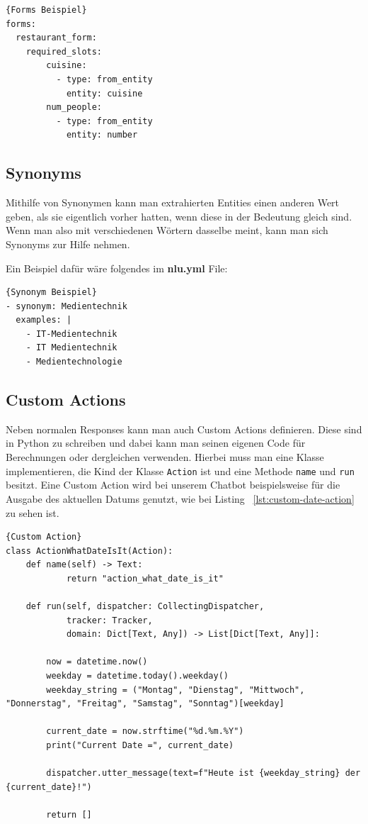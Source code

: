 \begin{lstlisting}[label={lst:forms-example},caption={Forms Beispiel}]{Forms Beispiel}
forms:
  restaurant_form:
    required_slots:
        cuisine:
          - type: from_entity
            entity: cuisine
        num_people:
          - type: from_entity
            entity: number
\end{lstlisting}

\subsection{Synonyms}

Mithilfe von Synonymen kann man extrahierten Entities einen anderen Wert geben, als sie eigentlich vorher hatten, wenn diese in der Bedeutung gleich sind.
Wenn man also mit verschiedenen Wörtern dasselbe meint, kann man sich Synonyms zur Hilfe nehmen.\cite{synonyms}

Ein Beispiel dafür wäre folgendes im \textbf{nlu.yml} File:

\begin{lstlisting}[label={lst:synonym-example},caption={Synonym Beispiel}]{Synonym Beispiel}
- synonym: Medientechnik
  examples: |
    - IT-Medientechnik
    - IT Medientechnik
    - Medientechnologie
\end{lstlisting}

\subsection{Custom Actions}

Neben normalen Responses kann man auch Custom Actions definieren.
Diese sind in Python zu schreiben und dabei kann man seinen eigenen Code für Berechnungen oder dergleichen verwenden.
Hierbei muss man eine Klasse implementieren, die Kind der Klasse \texttt{Action} ist und eine Methode \texttt{name} und \texttt{run} besitzt.
Eine Custom Action wird bei unserem Chatbot beispielsweise für die Ausgabe des aktuellen Datums genutzt, wie bei Listing ~\ref{lst:custom-date-action} zu sehen ist.

\begin{lstlisting}[label={lst:custom-date-action},caption={Custom Action für die Ausgabe des aktuellen Datums}]{Custom Action}
class ActionWhatDateIsIt(Action):
    def name(self) -> Text:
            return "action_what_date_is_it"

    def run(self, dispatcher: CollectingDispatcher,
            tracker: Tracker,
            domain: Dict[Text, Any]) -> List[Dict[Text, Any]]:

        now = datetime.now()
        weekday = datetime.today().weekday()
        weekday_string = ("Montag", "Dienstag", "Mittwoch", "Donnerstag", "Freitag", "Samstag", "Sonntag")[weekday]

        current_date = now.strftime("%d.%m.%Y")
        print("Current Date =", current_date)

        dispatcher.utter_message(text=f"Heute ist {weekday_string} der {current_date}!")

        return []
\end{lstlisting}


